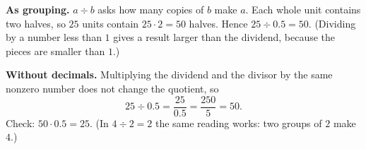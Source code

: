 \textbf{As grouping.} $a\div b$ asks how many copies of $b$ make $a$. Each whole unit contains two halves, so $25$ units contain $25\cdot2=50$ halves. Hence $25\div0.5=50$. (Dividing by a number less than $1$ gives a result larger than the dividend, because the pieces are smaller than $1$.)

\textbf{Without decimals.} Multiplying the dividend and the divisor by the same nonzero number does not change the quotient, so
\[
25\div0.5=\dfrac{25}{0.5}=\dfrac{250}{5}=\boxed{50}.
\]
Check: $50\cdot0.5=25$. (In $4\div2=2$ the same reading works: two groups of $2$ make $4$.)
